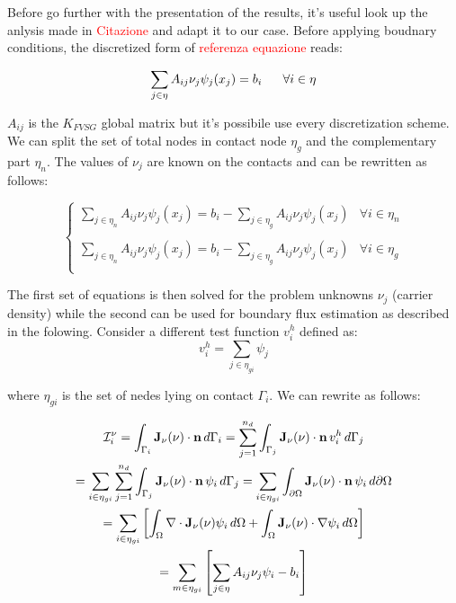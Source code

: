 Before go further with the presentation of the results, it's useful look up the anlysis made in \textcolor{red}{Citazione} and adapt it to our case. Before applying boudnary conditions, the discretized form of \textcolor{red}{referenza equazione} reads:

\begin{equation}
\label{eq: discretization before bc}
\sum_{j\in\eta} A_{ij} \nu_j\psi_j(x_j) = b_i \psp{10} \forall i \in \eta
\end{equation}

$A_{ij}$ is the $K_{FVSG}$ global matrix but it's possibile use every discretization scheme. We can split the set of total nodes in contact node $\eta_g$ and the complementary part $\eta_n$.
The values of $\nu_j$ are known on the contacts and  can be rewritten as follows:

\begin{equation}
\label{eq: discretization before bc 2}
\begin{cases}

\sum_{j\in\eta_n} A_{ij} \nu_j\psi_j(x_j) = b_i - \sum_{j\in\eta_g} A_{ij} \nu_j\psi_j(x_j) & \forall i \in \eta_n \\
\\
\sum_{j\in\eta_n} A_{ij} \nu_j\psi_j(x_j) = b_i - \sum_{j\in\eta_g} A_{ij} \nu_j\psi_j(x_j) & \forall i \in \eta_g \\

\end{cases}
\end{equation}

The first set of equations is then solved for the problem unknowns $\nu_j$ (carrier density) while the second can be used for boundary flux estimation as described in the folowing. Consider  a different test function $v^h_i$ defined as:
\begin{equation}
v^h_i=\sum_{j\in\eta_{gi} }\psi_j
\end{equation}

where $\eta_{gi}$ is the set of nedes lying on contact $\Gamma_i$. We can rewrite  as follows:

\begin{multline}
\mathcal{I}_i^\nu 
= \int_{\Gamma_i}\mathbf{J}_\nu(\nu) \cdot \mathbf{n} \, d{\Gamma_i}
= \sum_{j=1}^{n_d}\int_{\Gamma_j}\mathbf{J}_\nu(\nu) \cdot \mathbf{n} \,v_i^h \, d{\Gamma_j} \\
=\sum_{i\in\eta_{gi}}\sum_{j=1}^{n_d}\int_{\Gamma_j}\mathbf{J}_\nu(\nu) \cdot \mathbf{n} \, \psi_i \, d{\Gamma_j} 
= \sum_{i\in \eta_{gi}}\int_{\partial \Omega}\mathbf{J}_\nu(\nu) \cdot \mathbf{n} \, \psi_i \, d{\partial \Omega} \\
= \sum_{i\in \eta_{gi}} \left[ \int_{\Omega}\nabla \cdot \mathbf{J}_\nu(\nu) \psi_i \, d{\Omega} + \int_{\Omega}\mathbf{J}_\nu(\nu) \cdot \nabla\psi_i \, d{\Omega} \right] \\
= \sum_{m\in \eta_{gi}} \left[ \sum_{j\in\eta} A_{ij} \nu_j\psi_i - b_i  \right] \\
\end{multline}


